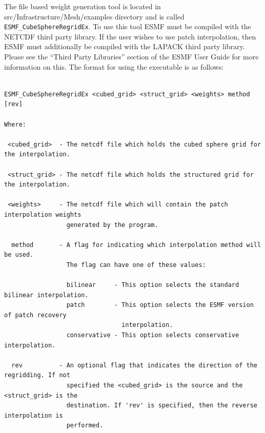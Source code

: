 The file based weight generation tool is located in src/Infrastructure/Mesh/examples 
directory and is called {\tt ESMF\_CubeSphereRegridEx}. To use this tool ESMF must be compiled 
with the NETCDF third party library. If the user wishes to use patch interpolation, 
then ESMF must additionally be compiled with the LAPACK third party library. Please see the 
``Third Party Libraries'' section of the ESMF User Guide for more information on this. 
The format for using the executable is as follows:

\begin{verbatim}

ESMF_CubeSphereRegridEx <cubed_grid> <struct_grid> <weights> method [rev]

Where:
                  
 <cubed_grid>  - The netcdf file which holds the cubed sphere grid for the interpolation. 
 
 <struct_grid> - The netcdf file which holds the structured grid for the interpolation. 

 <weights>     - The netcdf file which will contain the patch interpolation weights 
                 generated by the program.

  method       - A flag for indicating which interpolation method will be used.
                 The flag can have one of these values:

                 bilinear     - This option selects the standard bilinear interpolation.
                 patch        - This option selects the ESMF version of patch recovery 
                                interpolation.
                 conservative - This option selects conservative interpolation. 

  rev          - An optional flag that indicates the direction of the regridding. If not 
                 specified the <cubed_grid> is the source and the <struct_grid> is the 
                 destination. If 'rev' is specified, then the reverse interpolation is 
                 performed. 


\end{verbatim}




\newpage






